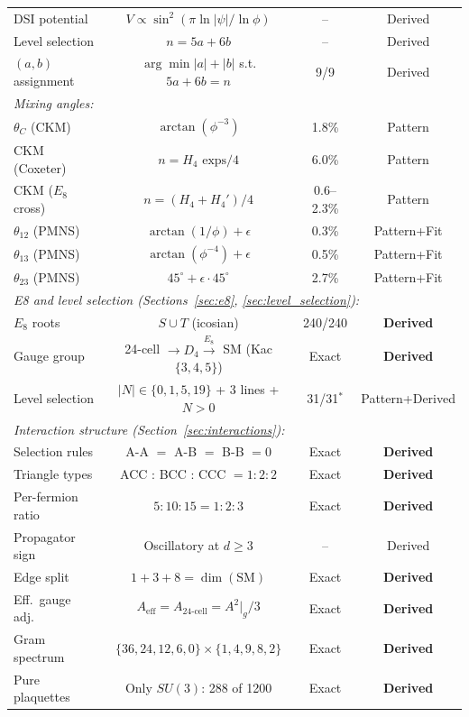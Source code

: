 \documentclass[12pt,a4paper]{article}
\begin{document}
\begin{table}[H]
\begin{tabular}{lccc}
DSI potential & $V \propto \sin^2(\pi\ln|\psi|/\ln\phi)$ & -- & Derived \\
Level selection & $n = 5a + 6b$ & -- & Derived \\
$(a,b)$ assignment & $\arg\min|a|+|b|$ s.t. $5a+6b=n$ & 9/9 & Derived \\
\midrule
\multicolumn{4}{l}{\textit{Mixing angles:}} \\
$\theta_C$ (CKM) & $\arctan(\phi^{-3})$ & 1.8\% & Pattern \\
CKM (Coxeter) & $n = H_4\text{ exps}/4$ & 6.0\% & Pattern \\
CKM ($E_8$ cross) & $n = (H_4 + H_4')/4$ & 0.6--2.3\% & Pattern \\
$\theta_{12}$ (PMNS) & $\arctan(1/\phi) + \epsilon$ & 0.3\% & Pattern+Fit \\
$\theta_{13}$ (PMNS) & $\arctan(\phi^{-4}) + \epsilon$ & 0.5\% & Pattern+Fit \\
$\theta_{23}$ (PMNS) & $45^\circ + \epsilon \cdot 45^\circ$ & 2.7\% & Pattern+Fit \\
\midrule
\multicolumn{4}{l}{\textit{E8 and level selection (Sections~\ref{sec:e8}, \ref{sec:level_selection}):}} \\
$E_8$ roots & $S \cup T$ (icosian) & 240/240 & \textbf{Derived} \\
Gauge group & 24-cell $\to D_4 \xrightarrow{E_8}$ SM (Kac $\{3,4,5\}$) & Exact & \textbf{Derived} \\
Level selection & $|N| \in \{0,1,5,19\}$ + 3 lines + $N>0$ & 31/31$^*$ & Pattern+Derived \\
\midrule
\multicolumn{4}{l}{\textit{Interaction structure (Section~\ref{sec:interactions}):}} \\
Selection rules & A-A $=$ A-B $=$ B-B $= 0$ & Exact & \textbf{Derived} \\
Triangle types & ACC : BCC : CCC $= 1:2:2$ & Exact & \textbf{Derived} \\
Per-fermion ratio & $5:10:15 = 1:2:3$ & Exact & \textbf{Derived} \\
Propagator sign & Oscillatory at $d \geq 3$ & -- & Derived \\
Edge split & $1 + 3 + 8 = \dim(\text{SM})$ & Exact & \textbf{Derived} \\
Eff.\ gauge adj. & $A_{\text{eff}} = A_{\text{24-cell}} = A^2|_g/3$ & Exact & \textbf{Derived} \\
Gram spectrum & $\{36,24,12,6,0\} \times \{1,4,9,8,2\}$ & Exact & \textbf{Derived} \\
Pure plaquettes & Only $SU(3)$: 288 of 1200 & Exact & \textbf{Derived} \\

\end{tabular}
\end{table}
\end{document}
